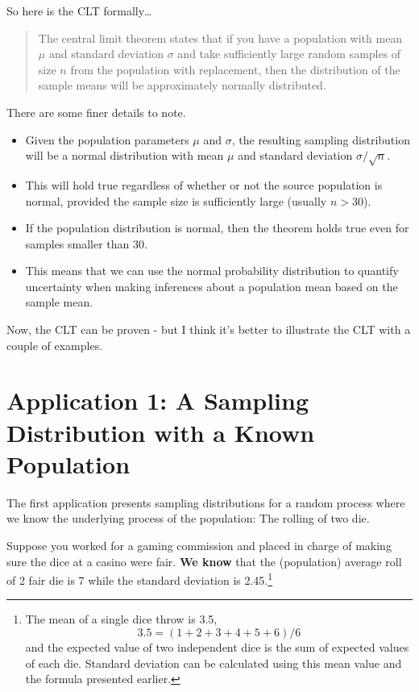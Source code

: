 \documentclass[
]{book}
\begin{document}
So here is the CLT formally\ldots{}

\begin{quote}
The central limit theorem states that if you have a population with mean \(\mu\) and standard deviation \(\sigma\) and take sufficiently large random samples of size \(n\) from the population with replacement, then the distribution of the sample means will be approximately normally distributed.
\end{quote}

There are some finer details to note.

\begin{itemize}
\item
  Given the population parameters \(\mu\) and \(\sigma\), the resulting sampling distribution will be a normal distribution with mean \(\mu\) and standard deviation \(\sigma / \sqrt{n}\).
\item
  This will hold true regardless of whether or not the source population is normal, provided the sample size is sufficiently large (usually \(n > 30\)).
\item
  If the population distribution is normal, then the theorem holds true even for samples smaller than 30.
\item
  This means that we can use the normal probability distribution to quantify uncertainty when making inferences about a population mean based on the sample mean.
\end{itemize}

Now, the CLT can be proven - but I think it's better to illustrate the CLT with a couple of examples.

\hypertarget{application-1-a-sampling-distribution-with-a-known-population}{%
\section{Application 1: A Sampling Distribution with a Known Population}\label{application-1-a-sampling-distribution-with-a-known-population}}

The first application presents sampling distributions for a random process where we know the underlying process of the population: The rolling of two die.

Suppose you worked for a gaming commission and placed in charge of making sure the dice at a casino were fair. \textbf{We know} that the (population) average roll of 2 fair die is 7 while the standard deviation is 2.45.\footnote{The mean of a single dice throw is 3.5,
  \[ 3.5 = (1 + 2 + 3 + 4 + 5 + 6) / 6\]
  and the expected value of two independent dice is the sum of expected values of each die. Standard deviation can be calculated using this mean value and the formula presented earlier.}
\end{document}
